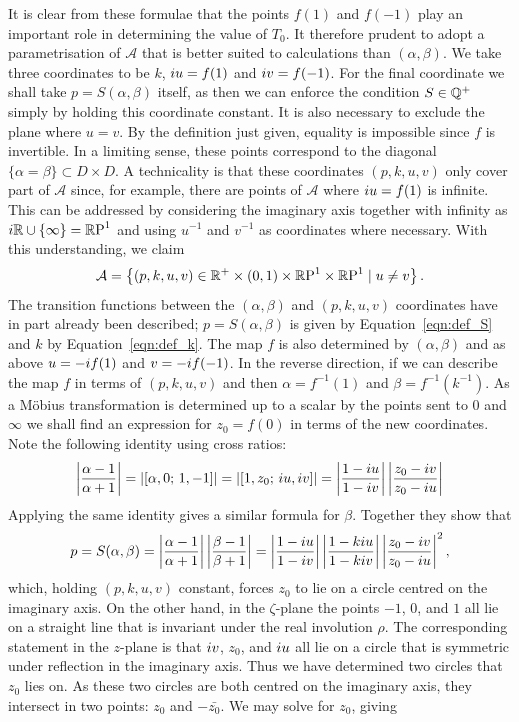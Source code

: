 \documentclass{article}
\begin{document}
It is clear from these formulae that the points $f(1)$ and $f(-1)$ play an important role in determining the value of $T_0$. It therefore prudent to adopt a parametrisation of $\mathcal{A}$ that is better suited to calculations than $(\alpha,\beta)$. We take three coordinates to be $k$, $i u = f(1)$ and $i v = f(-1)$. For the final coordinate we shall take $p=S(\alpha,\beta)$ itself, as then we can enforce the condition $S\in\mathbb{Q}^+$ simply by holding this coordinate constant. 
It is also necessary to exclude the plane where $u=v$. By the definition just given, equality is impossible since $f$ is invertible. In a limiting sense, these points correspond to the diagonal $\{\alpha=\beta\} \subset D\times D$. 
A technicality is that these coordinates $(p,k,u,v)$ only cover part of $\mathcal{A}$ since, for example, there are points of $\mathcal{A}$ where $i u = f(1)$ is infinite. This can be addressed by considering the imaginary axis together with infinity as $i\mathbb{R}\cup\{\infty\}=\mathbb{R}\text{P}^1$ and using $u^{-1}$ and $v^{-1}$ as coordinates where necessary. With this understanding, we claim
\[
\mathcal{A} = \left\{ (p,k,u,v) \in \mathbb{R}^+ \times (0,1) \times \mathbb{R}\text{P}^1\times \mathbb{R}\text{P}^1 \mid u\neq v\right\}.
\]
The transition functions between the $(\alpha, \beta)$ and $(p,k,u,v)$ coordinates have in part already been described; $p = S(\alpha,\beta)$ is given by Equation~\eqref{eqn:def_S} and $k$ by Equation~\eqref{eqn:def_k}. The map $f$ is also determined by $(\alpha,\beta)$ and as above $u = -i f(1)$ and $v = -i f(-1)$. In the reverse direction, if we can describe the map $f$ in terms of  $(p,k,u,v)$ and then $\alpha = f^{-1}(1)$ and $\beta = f^{-1}(k^{-1})$. As a M\"obius transformation is determined up to a scalar by the points sent to $0$ and $\infty$ we shall find an expression for $z_0 = f(0)$ in terms of the new coordinates. Note the following identity using cross ratios:
\[
\left|\frac{\alpha-1}{\alpha+1}\right|
= \left| \left[\alpha,0;\, 1, -1\right] \right|
= \left| \left[1,z_0;\, i u, i v\right] \right|
= \left|\frac{1-i u}{1 - i v}\right| \left|\frac{z_0 - i v}{z_0 - i u}\right|
\]
Applying the same identity gives a similar formula for $\beta$. Together they show that
\[
p = S(\alpha,\beta)
= \left|\frac{\alpha-1}{\alpha+1}\right| \left|\frac{\beta-1}{\beta+1}\right|
= \left|\frac{1-i u}{1 - i v}\right|\left|\frac{1 - ki u}{1 - ki v}\right| \left|\frac{z_0 - i v}{z_0 - i u}\right|^2,
\]
which, holding $(p,k,u,v)$ constant, forces $z_0$ to lie on a circle centred on the imaginary axis. On the other hand, in the $\zeta$-plane the points $-1$, $0$, and $1$ all lie on a straight line that is invariant under the real involution $\rho$. The corresponding statement in the $z$-plane is that $i v$, $z_0$, and $i u$ all lie on a circle that is symmetric under reflection in the imaginary axis. Thus we have determined two circles that $z_0$ lies on. As these two circles are both centred on the imaginary axis, they intersect in two points: $z_0$ and $-\bar{z_0}$. We may solve for $z_0$, giving
\end{document}

